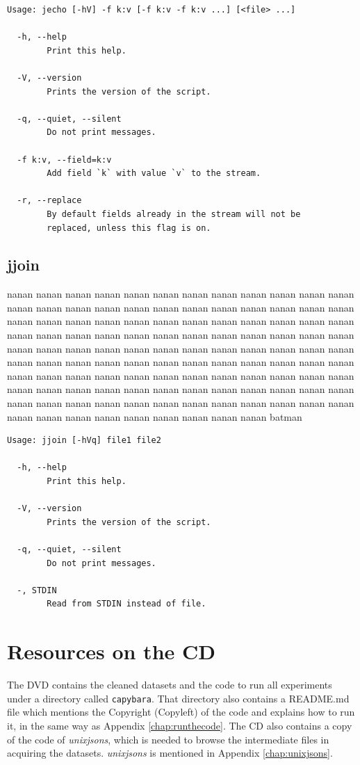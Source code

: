 \documentclass[11pt,a4paper,draft]{report}
\begin{document}
{\small
\begin{Verbatim}[samepage=true]
Usage: jecho [-hV] -f k:v [-f k:v -f k:v ...] [<file> ...]

  -h, --help
        Print this help.

  -V, --version
        Prints the version of the script.

  -q, --quiet, --silent
        Do not print messages.

  -f k:v, --field=k:v
        Add field `k` with value `v` to the stream.

  -r, --replace
        By default fields already in the stream will not be
        replaced, unless this flag is on.
\end{Verbatim}
}

\section{jjoin}

nanan nanan nanan nanan nanan nanan nanan nanan nanan nanan nanan nanan nanan
nanan nanan nanan nanan nanan nanan nanan nanan nanan nanan nanan nanan nanan
nanan nanan nanan nanan nanan nanan nanan nanan nanan nanan nanan nanan nanan
nanan nanan nanan nanan nanan nanan nanan nanan nanan nanan nanan nanan nanan
nanan nanan nanan nanan nanan nanan nanan nanan nanan nanan nanan nanan nanan
nanan nanan nanan nanan nanan nanan nanan nanan nanan nanan nanan nanan nanan
nanan nanan nanan nanan nanan nanan nanan nanan nanan nanan nanan nanan nanan
nanan nanan nanan nanan nanan nanan nanan nanan nanan nanan nanan nanan nanan
nanan nanan nanan nanan nanan nanan nanan nanan nanan nanan nanan nanan nanan
batman

{\small
\begin{Verbatim}[samepage=true]
Usage: jjoin [-hVq] file1 file2

  -h, --help
        Print this help.

  -V, --version
        Prints the version of the script.

  -q, --quiet, --silent
        Do not print messages.

  -, STDIN
        Read from STDIN instead of file.
\end{Verbatim}
}

\chapter{Resources on the CD}
\label{chap:resources}

The DVD contains the cleaned datasets and the code to run all experiments under
a directory called \texttt{capybara}.  That directory also contains a README.md
file which mentions the Copyright (Copyleft) of the code and explains how to
run it, in the same way as Appendix \ref{chap:runthecode}.  The CD also
contains a copy of the code of \emph{unixjsons}, which is needed to browse the
intermediate files in acquiring the datasets.  \emph{unixjsons} is mentioned in
Appendix \ref{chap:unixjsons}.
\end{document}
